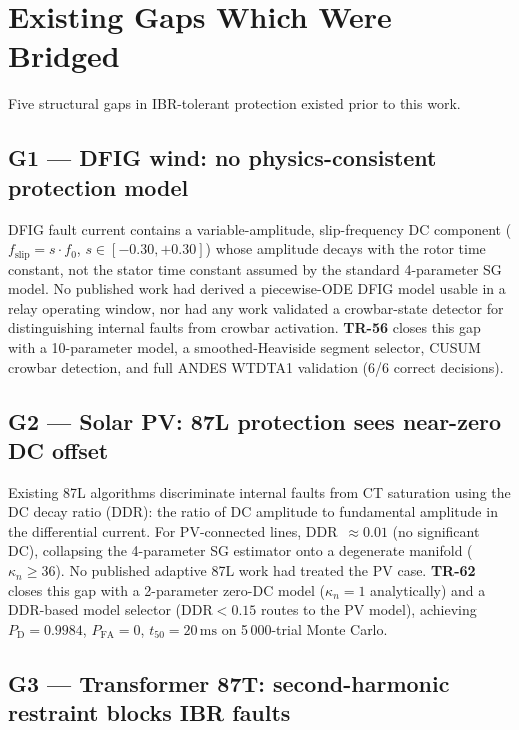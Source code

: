\documentclass
    [phd,synopsis]
    {iitmdissertation}
\newcommand{\ms}{\,\text{ms}}
\newcommand{\PD}{P_{\mathrm{D}}}
\newcommand{\PFA}{P_{\mathrm{FA}}}
\newcommand{\kn}{\kappa_n}
\begin{document}
\section{Existing Gaps Which Were Bridged}

Five structural gaps in IBR-tolerant protection existed prior to this work.

\subsection*{G1 — DFIG wind: no physics-consistent protection model}

DFIG fault current contains a variable-amplitude, slip-frequency
DC component ($f_{\mathrm{slip}} = s \cdot f_0$, $s \in [-0.30, +0.30]$) whose
amplitude decays with the rotor time constant, not the stator time constant
assumed by the standard 4-parameter SG model.
No published work had derived a piecewise-ODE DFIG model usable in a relay
operating window, nor had any work validated a crowbar-state detector for
distinguishing internal faults from crowbar activation.
\textbf{TR-56} closes this gap with a 10-parameter model, a smoothed-Heaviside
segment selector, CUSUM crowbar detection, and full ANDES WTDTA1 validation
(6/6 correct decisions).

\subsection*{G2 — Solar PV: 87L protection sees near-zero DC offset}

Existing 87L algorithms discriminate internal faults from CT saturation using
the DC decay ratio (DDR): the ratio of DC amplitude to fundamental amplitude
in the differential current.
For PV-connected lines, DDR~$\approx 0.01$ (no significant DC), collapsing the
4-parameter SG estimator onto a degenerate manifold ($\kn \geq 36$).
No published adaptive 87L work had treated the PV case.
\textbf{TR-62} closes this gap with a 2-parameter zero-DC model
($\kn = 1$ analytically) and a DDR-based model selector
($\text{DDR} < 0.15$ routes to the PV model), achieving $\PD = 0.9984$,
$\PFA = 0$, $t_{50} = 20\ms$ on 5\,000-trial Monte Carlo.

\subsection*{G3 — Transformer 87T: second-harmonic restraint blocks IBR faults}
\end{document}
